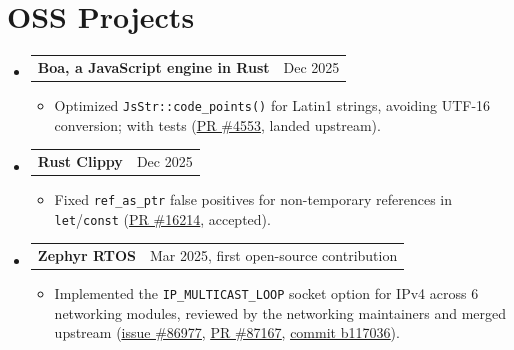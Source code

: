 \documentclass[letterpaper,11pt]{article}
\makeatletter
\newcommand{\resumeItem}[1]{
  \item\small{
    {#1 \vspace{-2pt}}
  }
}
\newcommand{\resumeProjectHeading}[2]{
    \item
    \begin{tabular*}{0.97\textwidth}{l@{\extracolsep{\fill}}r}
      \small#1 & #2 \\
    \end{tabular*}\vspace{-7pt}
}
\newcommand{\resumeSubHeadingListStart}{\begin{itemize}[leftmargin=0.15in, label={}]}
\newcommand{\resumeSubHeadingListEnd}{\end{itemize}}
\newcommand{\resumeItemListStart}{\begin{itemize}}
\newcommand{\resumeItemListEnd}{\end{itemize}\vspace{-5pt}}
\newcommand{\cvlink}[2]{\href{#1}{\underline{#2}}}
\makeatother
\begin{document}
\section{OSS Projects}
    \resumeSubHeadingListStart
      \resumeProjectHeading
          {\textbf{Boa, a JavaScript engine in Rust}}{Dec 2025}
          \resumeItemListStart
            \resumeItem{Optimized \texttt{JsStr::code\_points()} for Latin1 strings, avoiding UTF-16 conversion; with tests (\cvlink{https://github.com/boa-dev/boa/pull/4553}{PR \#4553}, landed upstream).}
          \resumeItemListEnd
      \resumeProjectHeading
          {\textbf{Rust Clippy}}{Dec 2025}
          \resumeItemListStart
            \resumeItem{Fixed \texttt{ref\_as\_ptr} false positives for non-temporary references in \texttt{let}/\texttt{const} (\cvlink{https://github.com/rust-lang/rust-clippy/pull/16214}{PR \#16214}, accepted).}
          \resumeItemListEnd
      \resumeProjectHeading
          {\textbf{Zephyr RTOS}}{Mar 2025, first open-source contribution}
          \resumeItemListStart
            \resumeItem{Implemented the \texttt{IP\_MULTICAST\_LOOP} socket option for IPv4 across 6 networking modules, reviewed by the networking maintainers and merged upstream (\cvlink{https://github.com/zephyrproject-rtos/zephyr/issues/86977}{issue \#86977}, \cvlink{https://github.com/zephyrproject-rtos/zephyr/pull/87167}{PR \#87167}, \cvlink{https://github.com/zephyrproject-rtos/zephyr/commit/b11703623c02f5afa4a5b0b7abdce3e324d7d470}{commit b117036}).}
          \resumeItemListEnd
    \resumeSubHeadingListEnd

\end{document}
